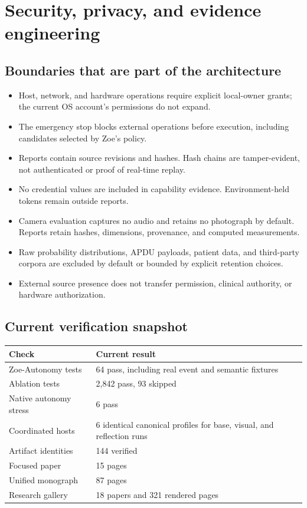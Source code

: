 \documentclass[11pt]{article}
\begin{document}
\clearpage
\section{Security, privacy, and evidence engineering}

\subsection{Boundaries that are part of the architecture}

\begin{itemize}
  \item Host, network, and hardware operations require explicit local-owner grants; the current OS account's permissions do not expand.
  \item The emergency stop blocks external operations before execution, including candidates selected by Zoe's policy.
  \item Reports contain source revisions and hashes. Hash chains are tamper-evident, not authenticated or proof of real-time replay.
  \item No credential values are included in capability evidence. Environment-held tokens remain outside reports.
  \item Camera evaluation captures no audio and retains no photograph by default. Reports retain hashes, dimensions, provenance, and computed measurements.
  \item Raw probability distributions, APDU payloads, patient data, and third-party corpora are excluded by default or bounded by explicit retention choices.
  \item External source presence does not transfer permission, clinical authority, or hardware authorization.
\end{itemize}

\subsection{Current verification snapshot}

\begin{center}
\begin{tabular}{ll}
\toprule
\textbf{Check} & \textbf{Current result}\\
\midrule
Zoe-Autonomy tests & 64 pass, including real event and semantic fixtures\\
Ablation tests & 2,842 pass, 93 skipped\\
Native autonomy stress & 6 pass\\
Coordinated hosts & 6 identical canonical profiles for base, visual, and reflection runs\\
Artifact identities & 144 verified\\
Focused paper & 15 pages\\
Unified monograph & 87 pages\\
Research gallery & 18 papers and 321 rendered pages\\
\bottomrule
\end{tabular}
\end{center}
\end{document}
